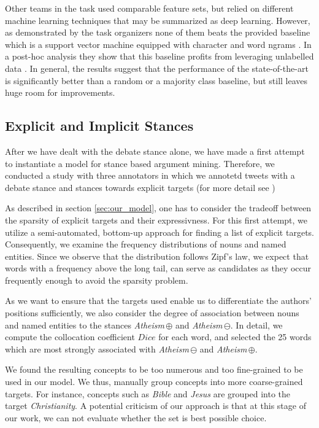 \documentclass[11pt]{article}
\begin{document}
Other teams in the task used comparable feature sets, but relied on different machine learning techniques that may be summarized as deep learning. 
However, as demonstrated by the task organizers none of them beats the provided baseline which is  a support vector machine equipped with character and word ngrams \cite{StanceSemEval2016}.
In a post-hoc analysis they show that this baseline profits from leveraging unlabelled data \cite{mohammad2016stance}.
In general, the results suggest that the performance of the state-of-the-art is significantly better than a random or a majority class baseline, but still leaves huge room for improvements.


\subsection{Explicit and Implicit Stances}
After we have dealt with the debate stance alone, we have made a first attempt to instantiate a model for stance based argument mining.
Therefore, we conducted a study with three annotators in which we annotetd tweets with a debate stance and stances towards explicit targets (for more detail see )

As described in section \ref{sec:our_model}, one has to consider the tradeoff between the sparsity of explicit targets and their expressivness.
For this first attempt, we utilize a semi-automated, bottom-up approach for finding a list of explicit targets.
Consequently, we examine the frequency distributions of nouns and named entities.
Since we observe that the distribution follows Zipf's law, we expect that words with a frequency above the long tail, can serve as candidates as they occur frequently enough to avoid the sparsity problem.

As we want to ensure that the targets used enable us to differentiate the authors' positions sufficiently, we also consider the degree of association between nouns and named entities to the stances \textit{Atheism}\,$\oplus$ and \textit{Atheism}\,$\ominus$.
In detail, we compute the collocation coefficient $Dice$ \cite{smadja1996translating} for each word, and selected the 25 words which are most strongly associated with \textit{Atheism}\,$\ominus$ and \textit{Atheism}\,$\oplus$.

We found the resulting concepts to be too numerous and too fine-grained to be used in our model.
We thus, manually group concepts into more coarse-grained targets.
For instance, concepts such as \textit{Bible} and \textit{Jesus} are grouped into the target \textit{Christianity}.
A potential criticism of our approach is that at this stage of our work, we can not evaluate whether the set is best possible choice.
\end{document}
